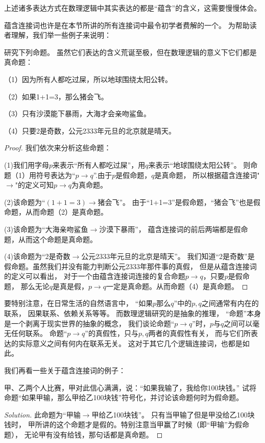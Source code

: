 上述诸多表达方式在数理逻辑中其实表达的都是“蕴含”的含义，这需要慢慢体会。

蕴含连接词也许是在本节所讲的所有连接词中最令初学者费解的一个。
为帮助读者理解，我们举一些例子来说明：

\begin{example}研究下列命题。
虽然它们表达的含义荒诞至极，但在数理逻辑的意义下它们都是真命题：

（1）因为所有人都吃过屎，所以地球围绕太阳公转。

（2）如果1+1=3，那么猪会飞。

（3）只有沙漠能下暴雨，大海才会亲吻鲨鱼。

（4）只要2是奇数，公元2333年元旦的北京就是晴天。
\end{example}
\begin{proof}
我们依次来分析这些命题：

(1)我们用字母$p$来表示“所有人都吃过屎”，用$q$来表示“地球围绕太阳公转”。
则命题（1）用符号表达为“$p\rightarrow q$”.由于$p$是假命题，$q$是真命题，
所以根据蕴含连接词"$\rightarrow$"的定义可知$p\rightarrow q$为真命题。

(2)该命题为“$(1+1=3)\rightarrow\text{猪会飞}$”。
由于“1+1=3”是假命题，“猪会飞”也是假命题，从而命题（2）是真命题。

(3)该命题为“大海亲吻鲨鱼$\rightarrow$沙漠下暴雨”，
蕴含连接词的前后两端都是假命题，从而这个命题是真命题。

(4)该命题为“2是奇数$\rightarrow$公元2333年元旦的北京是晴天”。
我们知道“2是奇数”是假命题。虽然我们并没有能力判断公元2333年那件事的真假，
但是从蕴含连接词的定义可以看出，
对于一个由蕴含连接词连接的复合命题$p\rightarrow q$，只要$p$是假命题，
那么无论$q$是真是假，$p\rightarrow q$一定是真命题。从而命题（4）是真命题。
\end{proof}

要特别注意，在日常生活的自然语言中，
“如果$p$那么$q$”中的$p,q$之间通常有内在的联系，
因果联系、依赖关系等等。
而数理逻辑研究的是抽象的推理，
“命题”本身是一个剥离于现实世界的抽象的概念，
我们谈论命题“$p\rightarrow q$”时，$p$与$q$之间可以毫无任何联系。
命题“$p\rightarrow q$”的真假性，只与$p,q$两者的真假性有关，
而与它们所表达的实际意义之间有何内在联系无关。
这对于其它几个逻辑连接词，也都是如此。

我们再看一些关于蕴含连接词的例子：

\begin{example}
甲、乙两个人比赛，甲对此信心满满，说：“如果我输了，我给你100块钱。”
试将命题“如果甲输，那么甲给乙100块钱”符号化，并讨论该命题何时为假命题。
\end{example}
\begin{proof}[Solution]
此命题为“甲输$\rightarrow$甲给乙100块钱”。
只有当甲输了但是甲没给乙100块钱时，
甲所讲的这个命题才是假的。特别注意当甲赢了时候（即“甲输”为假命题），
无论甲有没有给钱，那句话都是真命题。
\end{proof}

